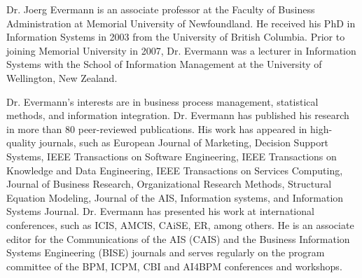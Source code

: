 %
%

Dr. Joerg Evermann is an associate professor at the Faculty of Business Administration at Memorial University of Newfoundland. He received his PhD in Information Systems in 2003 from the University of British Columbia. Prior to joining Memorial University in 2007, Dr. Evermann was a lecturer in Information Systems with the School of Information Management at the University of Wellington, New Zealand. 

Dr. Evermann's interests are in business process management, statistical methods, and information integration. Dr. Evermann has published his research in more than 80 peer-reviewed publications. His work has appeared in high-quality journals, such as European Journal of Marketing, Decision Support Systems, IEEE Transactions on Software Engineering, IEEE Transactions on Knowledge and Data Engineering, IEEE Transactions on Services Computing, Journal of Business Research, Organizational Research Methods, Structural Equation Modeling, Journal of the AIS, Information systems, and Information Systems Journal. Dr. Evermann has presented his work at international conferences, such as ICIS, AMCIS, CAiSE, ER, among others. He is an associate editor for the Communications of the AIS (CAIS) and the Business Information Systems Engineering (BISE) journals and serves regularly on the program committee of the BPM, ICPM, CBI and AI4BPM conferences and workshops.

